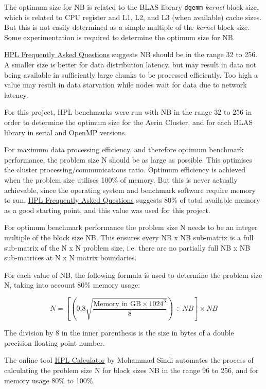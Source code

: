 The optimum size for NB is related to the BLAS library \verb|dgemm| \emph{kernel} block size, which is related to CPU register and L1, L2, and L3 (when available) cache sizes. But this is not easily determined as a simple multiple of the \emph{kernel} block size. Some experimentation is required to determine the optimum size for NB.

\href{https://www.netlib.org/benchmark/hpl/faqs.html}{HPL Frequently Asked Questions} suggests NB should be in the range 32 to 256. A smaller size is better for data distribution latency, but may result in data not being available in sufficiently large chunks to be processed efficiently. Too high a value may result in data starvation while nodes wait for data due to network latency.

For this project, HPL benchmarks were run with NB in the range 32 to 256 in order to determine the optimum size for the Aerin Cluster, and for each BLAS library in serial and OpenMP versions. 

For maximum data processing efficiency, and therefore optimum benchmark performance, the problem size N should be as large as possible. This optimises the cluster processing/communications ratio. Optimum efficiency is achieved when the problem size utilises 100\% of memory. But this is never actually achievable, since the operating system and benchmark software require memory to run. \href{https://www.netlib.org/benchmark/hpl/faqs.html}{HPL Frequently Asked Questions} suggests 80\% of total available memory as a good starting point, and this value was used for this project.

For optimum benchmark performance the problem size N needs to be an integer multiple of the block size NB. This ensures every NB x NB sub-matrix is a full sub-matrix of the N x N problem size, i.e. there are no partially full NB x NB sub-matrices at N x N matrix boundaries.

For each value of NB, the following formula is used to determine the problem size N, taking into account 80\% memory usage:

\[N = \left[\left(0.8 \sqrt{\frac{\text{Memory in GB} \times 1024^3}{8}}\right) \div NB\right] \times NB\]

The division by 8 in the inner parenthesis is the size in bytes of a double precision floating point number.


The online tool \href{http://hpl-calculator.sourceforge.net}{HPL Calculator} by Mohammad Sindi automates the process of calculating the problem size N for block sizes NB in the range 96 to 256, and for memory usage 80\% to 100\%.

